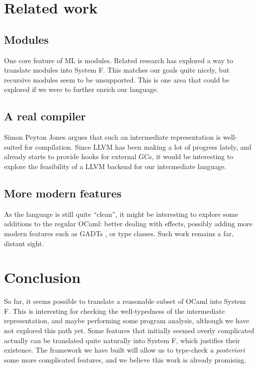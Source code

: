 \documentclass[10pt,a4paper,twoside,titlepage,twocolumn]{article}
\begin{document}
\section{Related work}

\subsection{Modules}

One core feature of ML is modules. Related research \cite{rossberg2010f} has
explored a way to translate modules into System F. This matches our goals quite
nicely, but recursive modules seem to be unsupported. This is one area that
could be explored if we were to further enrich our language.

\subsection{A real compiler}

Simon Peyton Jones argues \cite{sulzmann2007system} that such an intermediate
representation is well-suited for compilation. Since LLVM \cite{llvm} has been
making a lot of progress lately, and already starts to provide hooks for
external GCs, it would be interesting to explore the feasibility of a LLVM
backend for our intermediate language.

\subsection{More modern features}

As the language is still quite ``clean'', it might be interesting to explore
some additions to the regular OCaml: better dealing with effects, possibly
adding more modern features such as GADTs \cite{simonet2004constraint}, or type
classes. Such work remains a far, distant sight.

\section{Conclusion}

So far, it seems possible to translate a reasonable subset of OCaml into System
F. This is interesting for checking the well-typedness of the intermediate
representation, and maybe performing some program analysis, although we have not
explored this path yet. Some features that initially seemed overly complicated
actually can be translated quite naturally into System F, which justifies their
existence. The framework we have built will allow us to type-check \emph{a
posteriori} some more complicated features, and we believe this work is already
promising.
\end{document}
